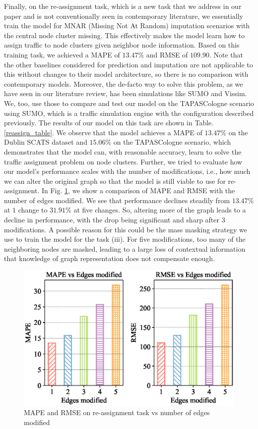 Finally, on the re-assignment task, which is a new task that we address in our paper and is not conventionally seen in contemporary literature, we essentially train the model for MNAR (Missing Not At Random) imputation scenarios with the central node cluster missing. This effectively makes the model learn how to assign traffic to node clusters given neighbor node information. Based on this training task, we achieved a MAPE of $13.47\%$ and RMSE of $109.90$. Note that the other baselines considered for prediction and imputation are not applicable to this without changes to their model architecture, so there is no comparison with contemporary models. Moreover, the de-facto way to solve this problem, as we have seen in our literature review, has been simulations like SUMO\cite{sumo} and Vissim\cite{vissim}. We, too, use those to compare and test our model on the TAPASCologne scenario using SUMO, which is a traffic simulation engine with the configuration described previously. The results of our model on this task are shown in Table. \ref{reassign_table}. We observe that the model achieves a MAPE of $13.47\%$ on the Dublin SCATS dataset and $15.06\%$ on the TAPASCologne scenario, which demonstrates that the model can, with reasonable accuracy, learn to solve the traffic assignment problem on node clusters. Further, we tried to evaluate how our model's performance scales with the number of modifications, i.e., how much we can alter the original graph so that the model is still viable to use for re-assignment. In Fig. \ref{fig:edge_modif}, we show a comparison of MAPE and RMSE with the number of edges modified. We see that performance declines steadily from $13.47\%$ at $1$ change to $31.91\%$ at five changes. So, altering more of the graph leads to a decline in performance, with the drop being significant and sharp after $3$ modifications. A possible reason for this could be the mass masking strategy we use to train the model for the task (iii). For five modifications, too many of the neighboring nodes are masked, leading to a large loss of contextual information that knowledge of graph representation does not compensate enough.

\begin{figure}[H]
    \centering
    \includegraphics[width=0.8\linewidth]{modif.eps}
    \caption{MAPE and RMSE on re-assignment task vs number of edges modified}
    \label{fig:edge_modif}
\end{figure}

